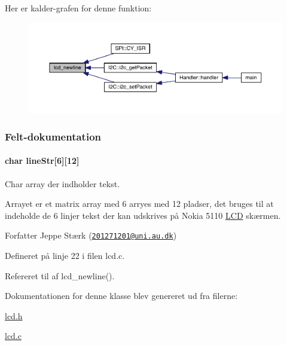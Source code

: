 Her er kalder-\/grafen for denne funktion\+:\nopagebreak
\begin{figure}[H]
\begin{center}
\leavevmode
\includegraphics[width=350pt]{class_l_c_d_a507dd352aee8161dc556e3d1439a2be2_icgraph}
\end{center}
\end{figure}




\subsubsection{Felt-\/dokumentation}
\paragraph[{\texorpdfstring{line\+Str}{lineStr}}]{\setlength{\rightskip}{0pt plus 5cm}char line\+Str\mbox{[}6\mbox{]}\mbox{[}12\mbox{]}\hspace{0.3cm}{\ttfamily [private]}}\hypertarget{class_l_c_d_a51a220275e6d21942189276ef7d9e7c3}{}\label{class_l_c_d_a51a220275e6d21942189276ef7d9e7c3}


Char array der indholder tekst. 

Arrayet er et matrix array med 6 arryes med 12 pladser, det bruges til at indeholde de 6 linjer tekst der kan udskrives på Nokia 5110 \hyperlink{class_l_c_d}{L\+CD} skærmen.

\begin{DoxyAuthor}{Forfatter}
Jeppe Stærk (\href{mailto:201271201@uni.au.dk}{\tt 201271201@uni.\+au.\+dk}) 
\end{DoxyAuthor}


Defineret på linje 22 i filen lcd.\+c.



Refereret til af lcd\+\_\+newline().



Dokumentationen for denne klasse blev genereret ud fra filerne\+:\begin{DoxyCompactItemize}
\item 
\hyperlink{lcd_8h}{lcd.\+h}\item 
\hyperlink{lcd_8c}{lcd.\+c}\end{DoxyCompactItemize}
